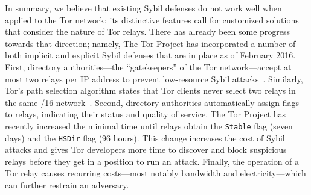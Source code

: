 In summary, we believe that existing Sybil defenses do not work well when
applied to the Tor network; its distinctive features call for customized
solutions that consider the nature of Tor relays.  There has already been
some progress towards that direction; namely, The Tor Project has incorporated
a number of both implicit and explicit Sybil defenses that are in place as of
February 2016.  First, directory authorities---the ``gatekeepers'' of the Tor
network---accept at most two relays per IP address to prevent low-resource Sybil
attacks~\cite{Bauer2007a,Bauer2007b}.  Similarly, Tor's path selection algorithm
states that Tor clients never select two relays in the same /16
network~\cite{path-spec}.  Second, directory authorities automatically assign
flags to relays, indicating their status and quality of service.  The Tor
Project has recently increased the minimal time until relays obtain the
\texttt{Stable} flag (seven days) and the \texttt{HSDir} flag (96 hours).  This
change increases the cost of Sybil attacks and gives Tor developers more time to
discover and block suspicious relays before they get in a position to run an
attack.  Finally, the operation of a Tor relay causes recurring costs---most
notably bandwidth and electricity---which can further restrain an adversary.

